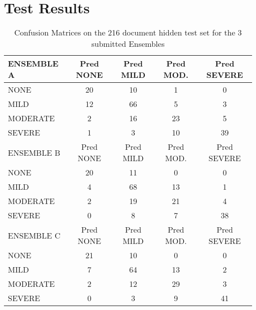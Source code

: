 
\section{Test Results}



\begin{table}
\centering
    \begin{tabular}{|l|c|c|c|c|}
       \hline
       \textsf{ \cellcolor{gray!15} ENSEMBLE A } & \textsf{ Pred NONE } & \textsf{ Pred MILD } & \textsf{ Pred MOD. } & \textsf{ Pred SEVERE } \\ 
       \hline
        \textsf{ NONE } & \cellcolor{gray!15} 20 & 10 & 1 & 0 \\ 
        \textsf{ MILD } & 12 & \cellcolor{gray!15} 66 & 5 & 3 \\ 
        \textsf{ MODERATE } & 2 & 16 & \cellcolor{gray!15} 23 & 5 \\ 
        \textsf{ SEVERE } & 1 & 3 & 10 & \cellcolor{gray!15} 39 \\ 
       \hline
       \textsf{ \cellcolor{gray!15} ENSEMBLE B } & \textsf{ Pred NONE } & \textsf{ Pred MILD } & \textsf{ Pred MOD. } & \textsf{ Pred SEVERE } \\ 
       \hline
        \textsf{ NONE } & \cellcolor{gray!15} 20 & 11 & 0 & 0 \\ 
        \textsf{ MILD } & 4 & \cellcolor{gray!15} 68 & 13 & 1 \\ 
        \textsf{ MODERATE } & 2 & 19 & \cellcolor{gray!15} 21 & 4 \\ 
        \textsf{ SEVERE } & 0 & 8 & 7 & \cellcolor{gray!15} 38 \\ 
       \hline
       \textsf{\cellcolor{gray!15} ENSEMBLE C } & \textsf{ Pred NONE } & \textsf{ Pred MILD } & \textsf{ Pred MOD. } & \textsf{ Pred SEVERE } \\ 
       \hline
        \textsf{ NONE } & \cellcolor{gray!15} 21 & 10 & 0 & 0 \\ 
        \textsf{ MILD } & 7 & \cellcolor{gray!15} 64 & 13 & 2 \\ 
        \textsf{ MODERATE } & 2 & 12 & \cellcolor{gray!15} 29 & 3 \\ 
        \textsf{ SEVERE } & 0 & 3 & 9 & \cellcolor{gray!15} 41 \\ 
       \hline
    \end{tabular}
    \caption{Confusion Matrices on the 216 document hidden test set for the 3 submitted Ensembles}
    \label{tab:EnsembleTestConfusionMatrix}
\end{table}

